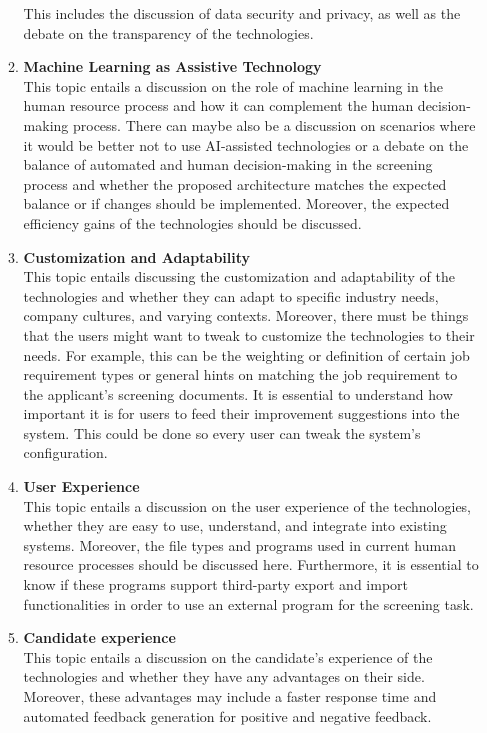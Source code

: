 \documentclass[draft,final]{thesisclass} %
\begin{document}
\begin{enumerate}
\begin{enumerate}
        This includes the discussion of data security and privacy, as well as the debate on the transparency of the technologies.
        \item \textbf{Machine Learning as Assistive Technology}\\
        This topic entails a discussion on the role of machine learning in the human resource process and how it can complement the human decision-making process.
        There can maybe also be a discussion on scenarios where it would be better not to use \acs{AI}-assisted technologies or a debate on the balance of automated and human decision-making in the screening process and whether the proposed architecture matches the expected balance or if changes should be implemented.
        Moreover, the expected efficiency gains of the technologies should be discussed.
        \item \textbf{Customization and Adaptability}\\
        This topic entails discussing the customization and adaptability of the technologies and whether they can adapt to specific industry needs, company cultures, and varying contexts.
        Moreover, there must be things that the users might want to tweak to customize the technologies to their needs.
        For example, this can be the weighting or definition of certain job requirement types or general hints on matching the job requirement to the applicant's screening documents.
        It is essential to understand how important it is for users to feed their improvement suggestions into the system.
        This could be done so every user can tweak the system's configuration.
        \item \textbf{User Experience}\\
        This topic entails a discussion on the user experience of the technologies, whether they are easy to use, understand, and integrate into existing systems.
        Moreover, the file types and programs used in current human resource processes should be discussed here.
        Furthermore, it is essential to know if these programs support third-party export and import functionalities in order to use an external program for the screening task.
        \item \textbf{Candidate experience}\\
        This topic entails a discussion on the candidate's experience of the technologies and whether they have any advantages on their side.
        Moreover, these advantages may include a faster response time and automated feedback generation for positive and negative feedback.

\end{enumerate}
\end{enumerate}
\end{document}
